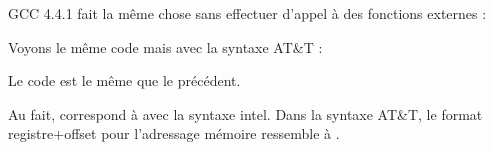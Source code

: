 
GCC 4.4.1 fait la même chose sans effectuer d'appel à des fonctions externes :




Voyons le même code mais avec la syntaxe AT\&T :



\myindex{\ATTSyntax}
Le code est le même que le précédent.

Au fait,  correspond à
 avec la syntaxe intel.
Dans la syntaxe AT\&T, le format registre+offset pour l'adressage mémoire
ressemble à .
